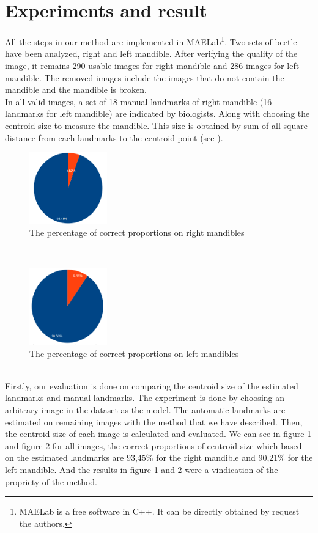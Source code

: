 \documentclass[twoside,twocolumn,10pt]{article}
\begin{document}
\section{Experiments and result}
All the steps in our method are implemented in MAELab\footnote{MAELab
  is a free software in C++. It can be directly obtained by request
  the authors.}. Two sets of beetle have been analyzed, right and left
mandible. After verifying the quality of the image, it remains 290
usable images for right mandible and 286 images for left mandible. The
removed images include the images that do not contain the mandible and
the mandible is broken.\\

In all valid images, a set of 18 manual landmarks of right mandible
(16 landmarks for left mandible) are indicated by biologists. Along
with choosing the centroid size to measure the mandible. This size is
obtained by sum of all square distance from each landmarks to the
centroid point (see \cite{web2010}).

\begin{figure}[htb]
    \centering
    \includegraphics[width=0.3\textwidth]{./images/mdresult}
    \caption{The percentage of correct proportions on right mandibles }
    \label{figmdresult}
\end{figure}~\\
\begin{figure}[htb]
    \centering
    \includegraphics[width=0.3\textwidth]{./images/mgresult}
    \caption{The percentage of correct proportions on left mandibles }
    \label{figmgresult}
\end{figure}~\\
Firstly, our evaluation is done on comparing the centroid size of the estimated landmarks and manual landmarks. The experiment is done by choosing an arbitrary 
image in the dataset as the model. The automatic landmarks are estimated on remaining images with the method that we have described. Then, the centroid size of each image is calculated and evaluated. We can see in figure
\ref{figmdresult} and figure \ref{figmgresult} for all images, the
correct proportions of centroid size which based on the estimated landmarks are 93,45\% for the right
mandible and 90,21\% for the left mandible. And the results in figure \ref{figmdresult} and \ref{figmgresult} were a vindication of the propriety of the method.\\
\end{document}
